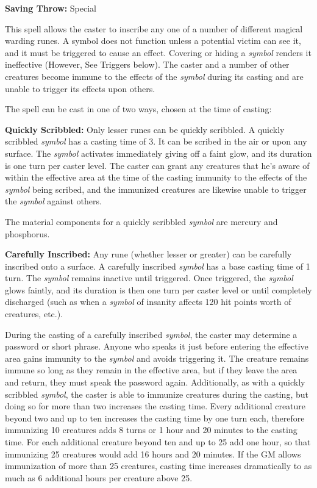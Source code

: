 \begin{multicols}{2}
\begin{minipage}{\columnwidth}
\noindent \textbf{Saving Throw:} Special

\end{minipage}

This spell allows the caster to inscribe any one of a number of different magical warding runes.  A symbol does not function unless a potential victim can see it, and it must be triggered to cause an effect.  Covering or hiding a \textit{symbol} renders it ineffective (However, See Triggers below).  The caster and a number of other creatures become immune to the effects of the \textit{symbol} during its casting and are unable to trigger its effects upon others.

The spell can be cast in one of two ways, chosen at the time of casting:

\textbf{Quickly Scribbled:} Only lesser runes can be quickly scribbled.  A quickly scribbled \textit{symbol} has a casting time of 3.  It can be scribed in the air or upon any surface.  The \textit{symbol} activates immediately giving off a faint glow, and its duration is one turn per caster level.  The caster can grant any creatures that he's aware of within the effective area at the time of the casting immunity to the effects of the \textit{symbol} being scribed, and the immunized creatures are likewise unable to trigger the \textit{symbol} against others.  

The material components for a quickly scribbled \textit{symbol} are mercury and phosphorus.

\textbf{Carefully Inscribed:} Any rune (whether lesser or greater) can be carefully inscribed onto a surface.  A carefully inscribed \textit{symbol} has a base casting time of 1 turn.  The \textit{symbol} remains inactive until triggered.  Once triggered, the \textit{symbol} glows faintly, and its duration is then one turn per caster level or until completely discharged (such as when a \textit{symbol} of insanity affects 120 hit points worth of creatures, etc.).    

During the casting of a carefully inscribed \textit{symbol}, the caster may determine a password or short phrase.  Anyone who speaks it just before entering the effective area gains immunity to the \textit{symbol} and avoids triggering it.  The creature remains immune so long as they remain in the effective area, but if they leave the area and return, they must speak the password again.  Additionally, as with a quickly scribbled \textit{symbol}, the caster is able to immunize creatures during the casting, but doing so for more than two increases the casting time.  Every additional creature beyond two and up to ten increases the casting time by one turn each, therefore immunizing 10 creatures adds 8 turns or 1 hour and 20 minutes to the casting time.  For each additional creature beyond ten and up to 25 add one hour, so that immunizing 25 creatures would add 16 hours and 20 minutes.  If the GM allows immunization of more than 25 creatures, casting time increases dramatically to as much as 6 additional hours per creature above 25. 


\end{multicols}
